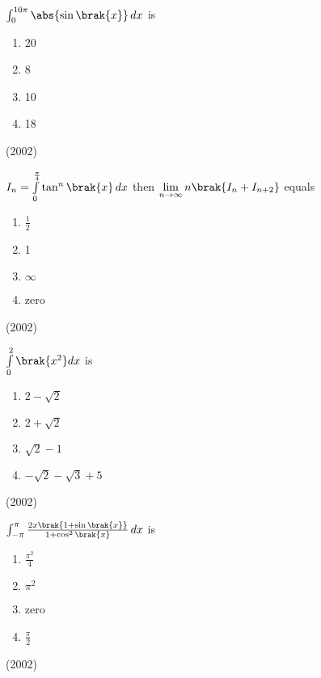\iffalse
\title{Definite Integrals and Applications of Integrals}
\author{AI24BTECH11015 - Harshvardhan Patidar}
\section{mains}
\fi


	\item 
		$\int_0^{10\pi} \abs{\sin \brak{x}} \, dx$ is  
		\begin{enumerate}
			\item 20\item 8\item 10\item 18
		\end{enumerate} 
		\hfill (2002)
	\item
		$I_n = \int \limits_{0}^{\frac{\pi}{4}} \tan^n \brak{x} \, dx$ then $\lim \limits_{n \to \infty} n\brak{I_n + I_{n+2}}$ equals 
				\begin{enumerate}
					\item $\frac{1}{2}$
	 				\item 1
					\item $\infty$
					\item zero
	 			\end{enumerate}
				\hfill(2002)
	\item
		$ \int \limits_0^2 \brak{x^2}dx $ is  
			\begin{enumerate}
				\item $2-\sqrt2$
				 \item $2+\sqrt2$
				\item $\sqrt2 - 1$
				\item $-\sqrt2 - \sqrt3 + 5$
			\end{enumerate}
			\hfill (2002)
	\item 
		$ \int_{-\pi}^{\pi} \frac{2x\brak{1 + \sin \brak{x}}}{1+\cos^2 \brak{x}} \, dx$ is
			\begin{enumerate}
				\itemsep0.3em
					\item $\frac{\pi^2}{4}$
					\item $\pi^2$
					\item zero
					\item $\frac{\pi}{2}$
			\end{enumerate}
			\hfill (2002)
	\item
